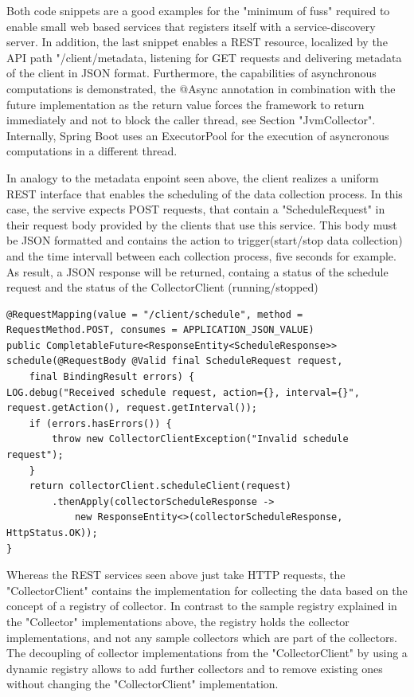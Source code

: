 Both code snippets are a good examples for the "minimum of fuss" required to enable small web based services that registers itself
with a service-discovery server. In addition, the last snippet enables a REST resource, localized by the API
path "/client/metadata, listening for GET requests and delivering metadata of the client in JSON format. Furthermore, the capabilities
of asynchronous computations is demonstrated, the @Async annotation in combination with the future implementation as the return
value forces the framework to return immediately and not to block the caller thread, see Section "JvmCollector". Internally,
Spring Boot uses an ExecutorPool for the execution of asyncronous computations in a different thread.

In analogy to the metadata enpoint seen above, the client realizes a uniform REST interface that enables the scheduling
of the data collection process. In this case, the servive expects POST requests, that contain a "ScheduleRequest" in their
request body provided by the clients that use this service. This body must be JSON formatted and contains the action to
trigger(start/stop data collection) and the time intervall between each collection process, five seconds for example. As result,
a JSON response will be returned, containg a status of the schedule request and the status of the CollectorClient (running/stopped)

\begin{lstlisting}[caption={"ScheduleController", REST endpoint}, captionpos=b, label={lst:schedule-endpoint}]
@RequestMapping(value = "/client/schedule", method = RequestMethod.POST, consumes = APPLICATION_JSON_VALUE)
public CompletableFuture<ResponseEntity<ScheduleResponse>> schedule(@RequestBody @Valid final ScheduleRequest request,
    final BindingResult errors) {
LOG.debug("Received schedule request, action={}, interval={}", request.getAction(), request.getInterval());
    if (errors.hasErrors()) {
        throw new CollectorClientException("Invalid schedule request");
    }
    return collectorClient.scheduleClient(request)
        .thenApply(collectorScheduleResponse ->
            new ResponseEntity<>(collectorScheduleResponse, HttpStatus.OK));
}
\end{lstlisting}

Whereas the REST services seen above just take HTTP requests, the "CollectorClient" contains the implementation for
collecting the data based on the concept of a registry of collector. In contrast to the sample registry explained in the
"Collector" implementations above, the registry holds the collector implementations, and not any sample collectors which
are part of the collectors. The decoupling of collector implementations from the "CollectorClient" by using a dynamic registry
allows to add further collectors and to remove existing ones without changing the "CollectorClient" implementation.

